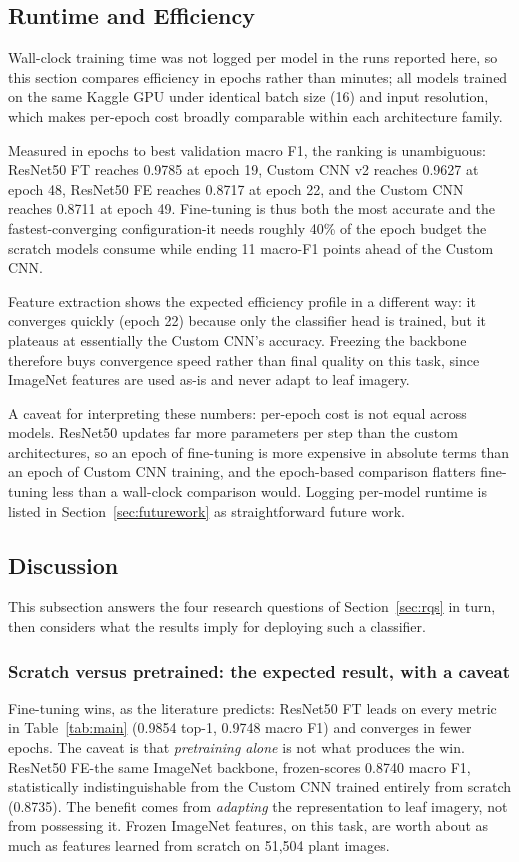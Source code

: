 \documentclass[12pt,a4paper]{article}
\begin{document}
\subsection{Runtime and Efficiency}
Wall-clock training time was not logged per model in the runs reported here, so this section compares efficiency in epochs rather than minutes; all models trained on the same Kaggle GPU under identical batch size (16) and input resolution, which makes per-epoch cost broadly comparable within each architecture family.

Measured in epochs to best validation macro F1, the ranking is unambiguous: ResNet50 FT reaches 0.9785 at epoch 19, Custom CNN v2 reaches 0.9627 at epoch 48, ResNet50 FE reaches 0.8717 at epoch 22, and the Custom CNN reaches 0.8711 at epoch 49. Fine-tuning is thus both the most accurate and the fastest-converging configuration-it needs roughly 40\% of the epoch budget the scratch models consume while ending 11 macro-F1 points ahead of the Custom CNN.

Feature extraction shows the expected efficiency profile in a different way: it converges quickly (epoch 22) because only the classifier head is trained, but it plateaus at essentially the Custom CNN's accuracy. Freezing the backbone therefore buys convergence speed rather than final quality on this task, since ImageNet features are used as-is and never adapt to leaf imagery.

A caveat for interpreting these numbers: per-epoch cost is not equal across models. ResNet50 updates far more parameters per step than the custom architectures, so an epoch of fine-tuning is more expensive in absolute terms than an epoch of Custom CNN training, and the epoch-based comparison flatters fine-tuning less than a wall-clock comparison would. Logging per-model runtime is listed in Section~\ref{sec:futurework} as straightforward future work.

\subsection{Discussion}
\label{sec:discussion}
This subsection answers the four research questions of Section~\ref{sec:rqs} in turn, then considers what the results imply for deploying such a classifier.

\subsubsection{Scratch versus pretrained: the expected result, with a caveat}
Fine-tuning wins, as the literature predicts: ResNet50 FT leads on every metric in Table~\ref{tab:main} (0.9854 top-1, 0.9748 macro F1) and converges in fewer epochs. The caveat is that \emph{pretraining alone} is not what produces the win. ResNet50 FE-the same ImageNet backbone, frozen-scores 0.8740 macro F1, statistically indistinguishable from the Custom CNN trained entirely from scratch (0.8735). The benefit comes from \emph{adapting} the representation to leaf imagery, not from possessing it. Frozen ImageNet features, on this task, are worth about as much as features learned from scratch on 51{,}504 plant images.
\end{document}
